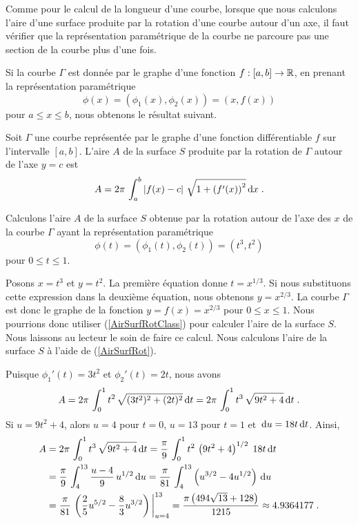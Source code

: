 {\begin{rmk}
Comme pour le calcul de la longueur d'une courbe, lorsque que nous
calculons l'aire d'une surface produite par la rotation d'une courbe
autour d'un axe, il faut vérifier que la représentation paramétrique
de la courbe ne parcoure pas une section de la courbe plus d'une
fois.
\end{rmk}

Si la courbe $\Gamma$ est donnée par le graphe d'une fonction
$f:[a,b]\rightarrow \mathbb{R}$, en prenant la représentation paramétrique
\[
\phi(x) = \left( \phi_1(x) , \phi_2(x) \right)
= \left( x , f(x) \right)
\]
pour $a \leq x \leq b$, nous obtenons le résultat suivant.

\begin{prop}
Soit $\Gamma$ une courbe représentée par le graphe d'une fonction
différentiable $f$ sur l'intervalle $[a,b]$.  L'aire $A$ de la surface
$S$ produite par la rotation de $\Gamma$ autour de l'axe $y=c$ est
\begin{equation} \label{AirSurfRotClass}
A = 2\pi\, \int_a^b \left| f(x)-c \right| \, 
\sqrt{1 + \left( f'(x) \right)^2} \,\mathrm{d}x \; .
\end{equation}
\end{prop}

\begin{egg}
Calculons l'aire $A$ de la surface $S$ obtenue par la rotation autour
de l'axe des $x$ de la courbe $\Gamma$ ayant la représentation
paramétrique
\[
\phi(t) = \left( \phi_1(t) , \phi_2(t) \right)
= \left( t^3 , t^2 \right)
\]
pour $0 \leq t \leq 1$.

Posons $x=t^3$ et $y=t^2$.  La première équation donne $t= x^{1/3}$.
Si nous substituons cette expression dans la deuxième équation, nous
obtenons $y = x^{2/3}$.   La courbe $\Gamma$ est donc le graphe de
la fonction $y = f(x) = x^{2/3}$ pour $0\leq x \leq 1$.  Nous pourrions
donc utiliser (\ref{AirSurfRotClass}) pour calculer l'aire de la
surface $S$.  Nous laissons au lecteur le soin de faire ce calcul.
Nous calculons l'aire de la surface $S$ à l'aide de
(\ref{AirSurfRot}).

Puisque $\phi_1'(t) = 3t^2$ et $\phi_2'(t) = 2t$, nous avons
\[
A = 2\pi \,\int_0^1 t^2 \, \sqrt{(3t^2)^2 + (2t)^2} \,\mathrm{d}t
= 2\pi \,\int_0^1 t^3 \, \sqrt{9t^2 + 4} \,\mathrm{d}t \; .
\]
Si $u=9 t^2 +4$, alors $u=4$ pour $t=0$, $u=13$ pour $t=1$ et
$\displaystyle \,\mathrm{d}u = 18 t \,\mathrm{d}t$.  Ainsi,
\begin{align*}
A &= 2\pi \,\int_0^1 t^3 \, \sqrt{9t^2 + 4} \,\mathrm{d}t
= \frac{\pi}{9} \, \int_0^1 t^2 \, \left(9t^2 + 4\right)^{1/2} \;
18 t \,\mathrm{d}t \\
&= \frac{\pi}{9} \, \int_4^{13} \frac{u-4}{9} \, u^{1/2} \,\mathrm{d}u
= \frac{\pi}{81} \, \int_4^{13} \left(u^{3/2}-4u^{1/2}\right) \,\mathrm{d}u \\
&= \frac{\pi}{81} \,\left( \frac{2}{5} u^{5/2}- \frac{8}{3} u^{3/2}
\right)\bigg|_{u=4}^{13}
= \frac{\pi\left(494\sqrt{13} + 128\right)}{1215}
\approx 4.9364177 \; .
\end{align*}
\end{egg}

}
